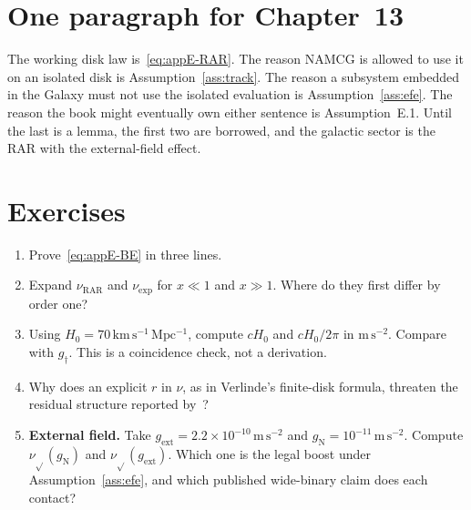 \section{One paragraph for Chapter~13}
\label{sec:appE-ch13}

The working disk law is~\eqref{eq:appE-RAR}.
The reason NAMCG is allowed to use it on an isolated disk is
Assumption~\ref{ass:track}.
The reason a subsystem embedded in the Galaxy must not use the
isolated evaluation is Assumption~\ref{ass:efe}.
The reason the book might eventually own either sentence is
Assumption~E.1.
Until the last is a lemma, the first two are borrowed, and the
galactic sector is the RAR with the external-field effect.

\section{Exercises}
\label{sec:appE-ex}

\begin{enumerate}
  \item Prove~\eqref{eq:appE-BE} in three lines.
  \item Expand \(\nu_{\mathrm{RAR}}\) and \(\nu_{\mathrm{exp}}\)
        for \(x\ll 1\) and \(x\gg 1\). Where do they first
        differ by order one?
  \item Using \(H_0=70\,\mathrm{km\,s^{-1}\,Mpc^{-1}}\), compute
        \(cH_0\) and \(cH_0/2\pi\) in \(\mathrm{m\,s^{-2}}\).
        Compare with \(g_\dagger\). This is a coincidence
        check, not a derivation.
  \item Why does an explicit \(r\) in \(\nu\), as in Verlinde's
        finite-disk formula, threaten the residual structure
        reported by~\cite{Lelli2017RAR}?
  \item \textbf{External field.}
    Take \(g_{\mathrm{ext}}=2.2\times 10^{-10}\,\mathrm{m\,s^{-2}}\)
    and \(g_{\mathrm{N}}=10^{-11}\,\mathrm{m\,s^{-2}}\).
    Compute \(\nu_{\sqrt{}}(g_{\mathrm{N}})\) and
    \(\nu_{\sqrt{}}(g_{\mathrm{ext}})\).
    Which one is the legal boost under Assumption~\ref{ass:efe}, and which
    published wide-binary claim does each contact?
\end{enumerate}